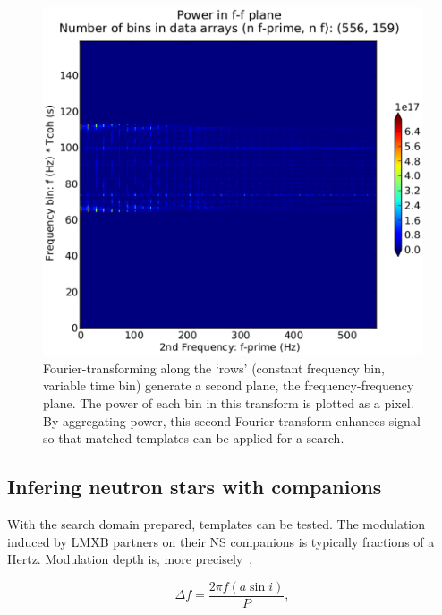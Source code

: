 \begin{figure}
\begin{center}
\includegraphics[width=0.8\paperwidth,height=0.4\paperheight]{ffplane-4e21-on-4e24.eps}
\caption{Fourier-transforming along the `rows' (constant frequency bin, variable time bin) generate a second plane, the frequency-frequency plane. The power of each bin in this transform is plotted as a pixel. By aggregating power, this second Fourier transform enhances signal so that matched templates can be applied for a search.}
\label{ffplane-figure}
\end{center}
\end{figure}

            \subsection{Infering neutron stars with companions}
            \label{inference}
 
With the search domain prepared, templates can be tested.
The modulation induced by LMXB partners on their NS companions is typically fractions of a Hertz.
Modulation depth is, more precisely~\cite{GoetzTwoSpectMethods2011},

\begin{equation}
\Delta f = \frac{2 \pi f (a \sin i)}{P},
\label{TwoSpect_mod_depth}
\end{equation}

